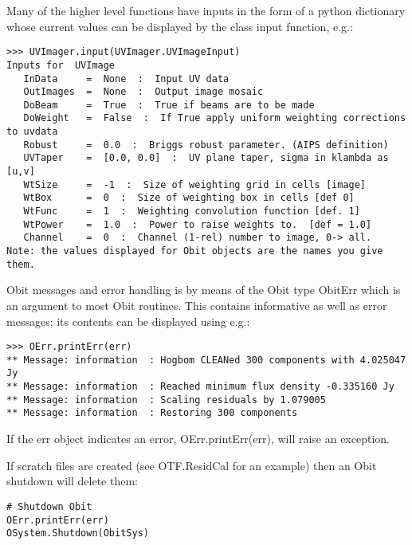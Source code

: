 \documentclass[11pt]{report}
\begin{document}
Many of the higher level functions have inputs in the form of a python dictionary
whose current values can be displayed by the class input function, e.g.:
\begin{verbatim}
>>> UVImager.input(UVImager.UVImageInput)
Inputs for  UVImage
   InData     =  None  :  Input UV data
   OutImages  =  None  :  Output image mosaic
   DoBeam     =  True  :  True if beams are to be made
   DoWeight   =  False  :  If True apply uniform weighting corrections to uvdata
   Robust     =  0.0  :  Briggs robust parameter. (AIPS definition)
   UVTaper    =  [0.0, 0.0]  :  UV plane taper, sigma in klambda as [u,v]
   WtSize     =  -1  :  Size of weighting grid in cells [image]
   WtBox      =  0  :  Size of weighting box in cells [def 0]
   WtFunc     =  1  :  Weighting convolution function [def. 1]
   WtPower    =  1.0  :  Power to raise weights to.  [def = 1.0]
   Channel    =  0  :  Channel (1-rel) number to image, 0-> all.
Note: the values displayed for Obit objects are the names you give
them.
\end{verbatim}

   Obit messages and error handling is by means of the Obit type
ObitErr which is an argument to most Obit routines.  This contains
informative as well as error messages; its contents can be displayed
using e.g.:
\begin{verbatim}
>>> OErr.printErr(err)
** Message: information  : Hogbom CLEANed 300 components with 4.025047 Jy
** Message: information  : Reached minimum flux density -0.335160 Jy
** Message: information  : Scaling residuals by 1.079005
** Message: information  : Restoring 300 components
\end{verbatim}
If  the err object indicates an error, OErr.printErr(err), will raise
an exception.

   If scratch files are created (see OTF.ResidCal for an example) then
an Obit shutdown will delete them:
\begin{verbatim}
# Shutdown Obit
OErr.printErr(err)
OSystem.Shutdown(ObitSys)
\end{verbatim}
\end{document}
